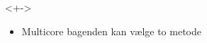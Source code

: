 \documentclass[t]{beamer}
\begin{document}
\begin{frame}[fragile]
  <+->
  \begin{itemize}
    \item<+-> Multicore bagenden kan vælge to metode
  \end{itemize}
\end{frame}
\end{document}
